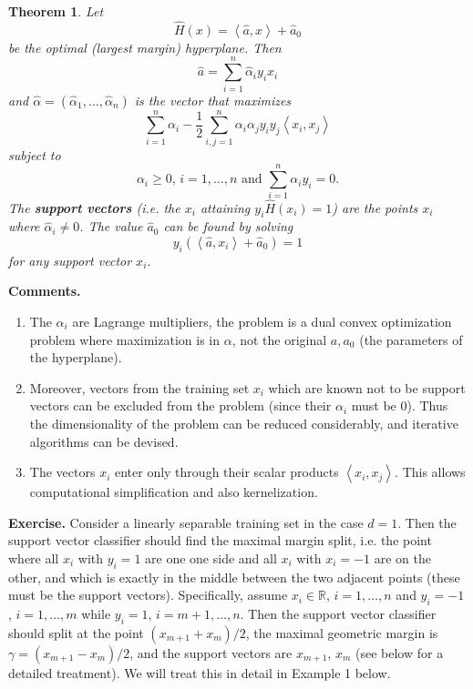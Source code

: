 \documentclass[11pt,twoside]{article}%
\theoremstyle{change}
\newtheorem{theorem}{Theorem}[section]
\begin{document}
\begin{theorem}
\label{theor-SVM-dual-optim-problem-}Let
\[
\hat{H}(x)=\left\langle \hat{a},x\right\rangle +\hat{a}_{0}%
\]
be the optimal (largest margin) hyperplane. Then
\[
\hat{a}=\sum_{i=1}^{n}\hat{\alpha}_{i}y_{i}x_{i}%
\]
and $\hat{\alpha}=\left(  \hat{\alpha}_{1},\ldots,\hat{\alpha}_{n}\right)  $
is the vector that maximizes
\[
\sum_{i=1}^{n}\alpha_{i}-\frac{1}{2}\sum_{i,j=1}^{n}\alpha_{i}\alpha_{j}%
y_{i}y_{j}\left\langle x_{i},x_{j}\right\rangle
\]
subject to
\[
\alpha_{i}\geq0\text{, }i=1,\ldots,n\text{ and }\sum_{i=1}^{n}\alpha_{i}%
y_{i}=0.
\]
The \textbf{support vectors} (i.e. the $x_{i}$ attaining $y_{i}\hat{H}%
(x_{i})=1$) are the points $x_{i}$ where $\hat{\alpha}_{i}\neq0$. The value
$\hat{a}_{0}$ can be found by solving
\[
y_{i}\left(  \left\langle \hat{a},x_{i}\right\rangle +\hat{a}_{0}\right)  =1
\]
for any support vector $x_{i}$.
\end{theorem}

\textbf{Comments. }

\begin{enumerate}
\item The $\alpha_{i}$ are Lagrange multipliers, the problem is a dual convex
optimization problem where maximization is in $\alpha$, not the original
$a,a_{0}$ (the parameters of the hyperplane).

\item Moreover, vectors from the training set $x_{i}$ which are known not to
be support vectors can be excluded from the problem (since their $\alpha_{i} $
must be $0$). Thus the dimensionality of the problem can be reduced
considerably, and iterative algorithms can be devised.

\item The vectors $x_{i}$ enter only through their scalar products
$\left\langle x_{i},x_{j}\right\rangle $. This allows computational
simplification and also kernelization.
\end{enumerate}

\textbf{Exercise. }Consider a linearly separable training set in the case
$d=1$. Then the support vector classifier should find the maximal margin
split, i.e. the point where all $x_{i}$ with $y_{i}=1$ are one one side and
all $x_{i}$ with $x_{i}=-1$ are on the other, and which is exactly in the
middle between the two adjacent points (these must be the support vectors).
Specifically, assume $x_{i}\in\mathbb{R}$, $i=1,\ldots,n$ and $y_{i}=-1$,
$i=1,\ldots,m$ while $y_{i}=1$, $i=m+1,\ldots,n$. Then the support vector
classifier should split at the point $\left(  x_{m+1}+x_{m}\right)  /2$, the
maximal geometric margin is $\gamma=\left(  x_{m+1}-x_{m}\right)  /2$, and the
support vectors are $x_{m+1}$, $x_{m}$ (see below for a detailed treatment).
We will treat this in detail in Example 1 below. \bigskip\bigskip
\end{document}

